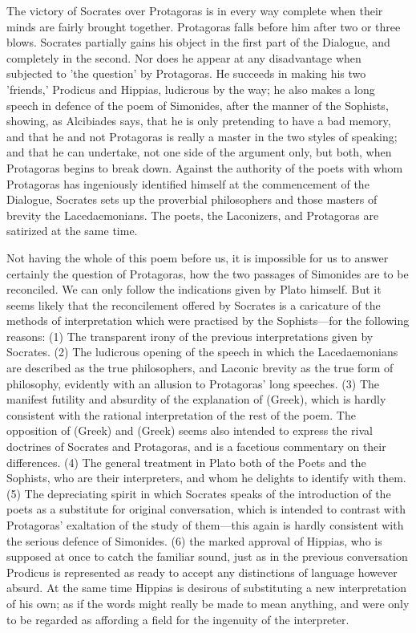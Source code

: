 \documentclass[11pt,letter]{article}
\begin{document}
\par  The victory of Socrates over Protagoras is in every way complete when their minds are fairly brought together. Protagoras falls before him after two or three blows. Socrates partially gains his object in the first part of the Dialogue, and completely in the second. Nor does he appear at any disadvantage when subjected to 'the question' by Protagoras. He succeeds in making his two 'friends,' Prodicus and Hippias, ludicrous by the way; he also makes a long speech in defence of the poem of Simonides, after the manner of the Sophists, showing, as Alcibiades says, that he is only pretending to have a bad memory, and that he and not Protagoras is really a master in the two styles of speaking; and that he can undertake, not one side of the argument only, but both, when Protagoras begins to break down. Against the authority of the poets with whom Protagoras has ingeniously identified himself at the commencement of the Dialogue, Socrates sets up the proverbial philosophers and those masters of brevity the Lacedaemonians. The poets, the Laconizers, and Protagoras are satirized at the same time.

\par  Not having the whole of this poem before us, it is impossible for us to answer certainly the question of Protagoras, how the two passages of Simonides are to be reconciled. We can only follow the indications given by Plato himself. But it seems likely that the reconcilement offered by Socrates is a caricature of the methods of interpretation which were practised by the Sophists—for the following reasons: (1) The transparent irony of the previous interpretations given by Socrates. (2) The ludicrous opening of the speech in which the Lacedaemonians are described as the true philosophers, and Laconic brevity as the true form of philosophy, evidently with an allusion to Protagoras' long speeches. (3) The manifest futility and absurdity of the explanation of (Greek), which is hardly consistent with the rational interpretation of the rest of the poem. The opposition of (Greek) and (Greek) seems also intended to express the rival doctrines of Socrates and Protagoras, and is a facetious commentary on their differences. (4) The general treatment in Plato both of the Poets and the Sophists, who are their interpreters, and whom he delights to identify with them. (5) The depreciating spirit in which Socrates speaks of the introduction of the poets as a substitute for original conversation, which is intended to contrast with Protagoras' exaltation of the study of them—this again is hardly consistent with the serious defence of Simonides. (6) the marked approval of Hippias, who is supposed at once to catch the familiar sound, just as in the previous conversation Prodicus is represented as ready to accept any distinctions of language however absurd. At the same time Hippias is desirous of substituting a new interpretation of his own; as if the words might really be made to mean anything, and were only to be regarded as affording a field for the ingenuity of the interpreter.
\end{document}
